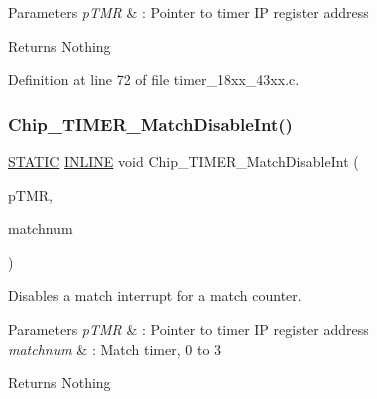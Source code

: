 \begin{DoxyParams}{Parameters}
{\em p\+T\+MR} & \+: Pointer to timer IP register address \\
\hline
\end{DoxyParams}
\begin{DoxyReturn}{Returns}
Nothing 
\end{DoxyReturn}


Definition at line 72 of file timer\+\_\+18xx\+\_\+43xx.\+c.

\mbox{\label{group___t_i_m_e_r__18_x_x__43_x_x_ga81252a6e24fddbf78d62f791f589306e}} 
\subsubsection{\texorpdfstring{Chip\+\_\+\+T\+I\+M\+E\+R\+\_\+\+Match\+Disable\+Int()}{Chip\_TIMER\_MatchDisableInt()}}
{\footnotesize\ttfamily \hyperlink{group___l_p_c___types___public___macros_ga10b2d890d871e1489bb02b7e70d9bdfb}{S\+T\+A\+T\+IC} \hyperlink{spifi__18xx__43xx_8h_a2eb6f9e0395b47b8d5e3eeae4fe0c116}{I\+N\+L\+I\+NE} void Chip\+\_\+\+T\+I\+M\+E\+R\+\_\+\+Match\+Disable\+Int (\begin{DoxyParamCaption}\item[{\hyperlink{struct_l_p_c___t_i_m_e_r___t}{L\+P\+C\+\_\+\+T\+I\+M\+E\+R\+\_\+T} $\ast$}]{p\+T\+MR,  }\item[{int8\+\_\+t}]{matchnum }\end{DoxyParamCaption})}



Disables a match interrupt for a match counter. 


\begin{DoxyParams}{Parameters}
{\em p\+T\+MR} & \+: Pointer to timer IP register address \\
\hline
{\em matchnum} & \+: Match timer, 0 to 3 \\
\hline
\end{DoxyParams}
\begin{DoxyReturn}{Returns}
Nothing 
\end{DoxyReturn}


